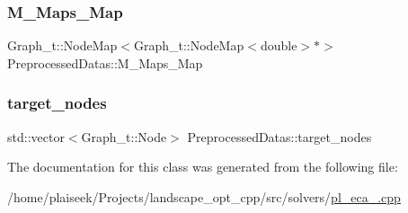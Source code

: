 \mbox{\label{class_preprocessed_datas_aa8a3dc93b539bbc1291e03d2904fe4f3}} 
\subsubsection{\texorpdfstring{M\+\_\+\+Maps\+\_\+\+Map}{M\_Maps\_Map}}
{\footnotesize\ttfamily Graph\+\_\+t\+::\+Node\+Map$<$Graph\+\_\+t\+::\+Node\+Map$<$double$>$$\ast$$>$ Preprocessed\+Datas\+::\+M\+\_\+\+Maps\+\_\+\+Map}

\mbox{\label{class_preprocessed_datas_af9a7df9ec408a8a1be2daa954bc39826}} 
\subsubsection{\texorpdfstring{target\+\_\+nodes}{target\_nodes}}
{\footnotesize\ttfamily std\+::vector$<$Graph\+\_\+t\+::\+Node$>$ Preprocessed\+Datas\+::target\+\_\+nodes}



The documentation for this class was generated from the following file\+:\begin{DoxyCompactItemize}
\item 
/home/plaiseek/\+Projects/landscape\+\_\+opt\+\_\+cpp/src/solvers/\hyperlink{pl__eca__3_8cpp}{pl\+\_\+eca\+\_.\+cpp}\end{DoxyCompactItemize}
